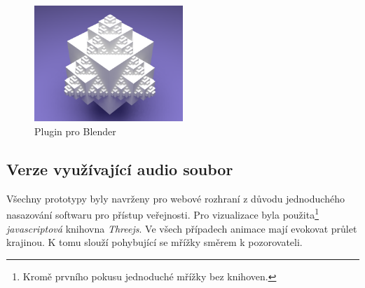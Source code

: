 \documentclass[thesis=B, czech]{FITthesis}[2019/03/06]
\makeatletter
\newenvironment{verze}[6]{ 
    \begin{table}[] 
    \begin{tabular}[t]{@{}ll@{}} 
    \toprule
      \multicolumn{2}{c}{#1}  \\ \midrule
    \multicolumn{2}{c}{          \ \ \ \ \ \ \ \
    \texttt{[image: \#5]}         \ \ \  \ \ \ \ \ 
    }         \\
    verze:            & #2      \\
    technologie:      & #3     \\
    parametry:         & \begin{tabular}[c]{@{}l@{}}#4\end{tabular}       \\ [15pt]
    krátký popis:         & \begin{tabular}[c]{@{}l@{}} #6 \end{tabular}       \\\bottomrule
    \end{tabular}
    \end{table}
    }
\makeatother
\begin{document}
\begin{figure}[h]
\centering
    \includegraphics[width=0.5\textwidth]{images/previous_versions/01.png}
    \caption{Plugin pro Blender}
    \label{fig:blender}
   
\end{figure}



\subsection*{Verze využívající audio soubor}

Všechny prototypy byly navrženy pro webové rozhraní z důvodu jednoduchého nasazování softwaru pro přístup veřejnosti. Pro vizualizace byla použita\footnote{Kromě prvního pokusu jednoduché mřížky bez knihoven.} \textit{javascriptová} knihovna \textit{Threejs}. Ve všech případech animace mají evokovat průlet krajinou. K tomu slouží pohybující se mřížky směrem k pozorovateli. 

\end{document}
